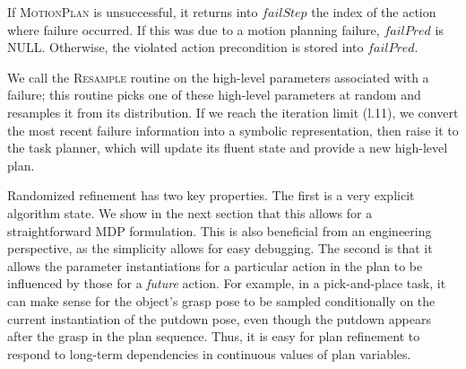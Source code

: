 If \textsc{MotionPlan} is unsuccessful, it returns into $failStep$ the index of the action where failure occurred.
If this was due to a motion planning failure, $failPred$ is NULL. Otherwise,
the violated action precondition is stored into $failPred$.

We call the \textsc{Resample} routine on the high-level parameters
associated with a failure; this routine picks one of these high-level parameters at random and
resamples it from its distribution. If we reach the iteration limit (l.11),
we convert the most recent failure information into a symbolic representation, then raise it
to the task planner, which will update its fluent state and provide a new
high-level plan.

Randomized refinement has two key properties. The first is a very explicit algorithm state.
We show in the next section that this allows for a straightforward MDP
formulation. This is also beneficial from an
engineering perspective, as the simplicity allows for easy debugging. The second is that
it allows the parameter instantiations for a particular action in
the plan to be influenced by those for a \emph{future} action. For example, in a
pick-and-place task, it can make sense for the object's grasp pose to be sampled
conditionally on the current instantiation of the putdown pose, even though the putdown
appears after the grasp in the plan sequence. Thus, it is easy for plan refinement to
respond to long-term dependencies in continuous values of plan variables.